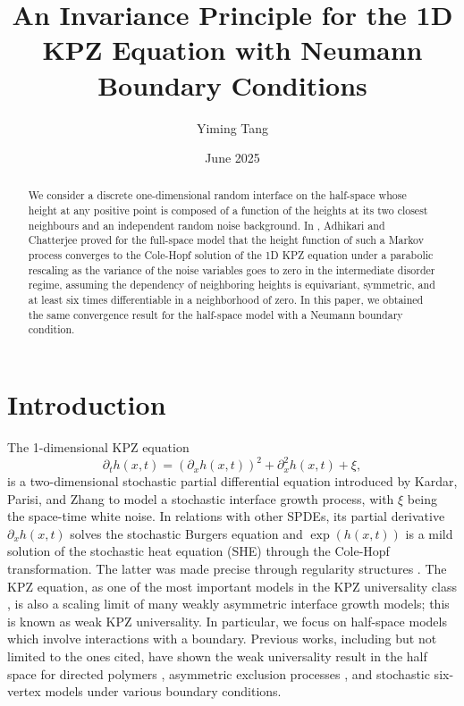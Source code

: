 \documentclass[10pt]{article}
\title{An Invariance Principle for the 1D KPZ Equation with Neumann Boundary Conditions}
\author[1]{Yiming Tang}
\affil[1]{Department of Mathematics, University of Toronto}
\date{June 2025}
\begin{document}
\newcommand{\eqdis}{\stackrel{d}{=}}
\newcommand{\LL}{\mathcal{L}}
\newcommand{\rr}{\mathbb{R}}
\newcommand{\nn}{\mathbb{N}}
\newcommand{\zz}{\mathbb{Z}}
\newcommand{\YT}[1]{\textcolor{red}{{\sf (Yiming:} {\sl{#1})}}}
\newcommand{\fix}[1]{\textcolor{red}{{\sf (Fix:} {\sl{#1})}}}

\maketitle


\begin{abstract}
    We consider a discrete one-dimensional random interface on the half-space whose height at any positive point is composed of a function of the heights at its two closest neighbours and an independent random noise background. In \cite{adhikari2022invariance}, Adhikari and Chatterjee proved for the full-space model that the height function of such a Markov process converges to the Cole-Hopf solution of the 1D KPZ equation under a parabolic rescaling as the variance of the noise variables goes to zero in the intermediate disorder regime, assuming the dependency of neighboring heights is equivariant, symmetric, and at least six times differentiable in a neighborhood of zero. In this paper, we obtained the same convergence result for the half-space model with a Neumann boundary condition.
\end{abstract}



\section{Introduction}

The 1-dimensional KPZ equation
\begin{equation}
    \partial_t h(x,t)= (\partial_x h(x,t))^2+\partial_x^2 h(x,t) + \xi,
\end{equation}
is a two-dimensional stochastic partial differential equation introduced by Kardar, Parisi, and Zhang \cite{KPZ86} to model a stochastic interface growth process, with $\xi$ being the space-time white noise. In relations with other SPDEs, its partial derivative $\partial_x h(x,t)$ solves the stochastic Burgers equation and $\exp(h(x,t))$ is a mild solution of the stochastic heat equation (SHE) through the Cole-Hopf transformation. The latter was made precise through regularity structures \cite{Hairer_2014}. 
The KPZ equation, as one of the most important models in the KPZ universality class \cite{wu2023kpzequationdirectedlandscape}, is also a scaling limit of many weakly asymmetric interface growth models; this is known as weak KPZ universality. In particular, we focus on half-space models which involve interactions with a boundary. Previous works, including but not limited to the ones cited, have shown the weak universality result in the half space for directed polymers \cite{Wu20} \cite{Par22} \cite{BC23}, asymmetric exclusion processes \cite{CS18} \cite{Par18}, and stochastic six-vertex models \cite{6V2} under various boundary conditions.
\end{document}
